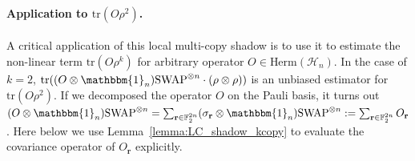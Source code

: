 \documentclass[aps,%
twocolumn,%
floatfix,%
pra,%
amsfonts,%
groupedaddress,%
superscriptaddress]{revtex4-2}%
\newcommand{\1}{\mathbbm{1}}
\begin{document}
\paragraph{Application to $\text{tr}(O \rho^2)$.}
A critical application of this local multi-copy shadow is to use it to estimate the non-linear term $\text{tr}(O \rho^k)$ for arbitrary operator $O \in \text{Herm}(\mathcal{H}_n)$.
In the case of $k  =2$, $\text{tr}((O \otimes \1_n) \text{SWAP}^{\otimes n}\cdot (\rho \otimes \rho))$ is an unbiased estimator for $\text{tr}(O \rho^2)$. If we decomposed the operator $O$ on the Pauli basis, it turns out $(O \otimes \1_n)\text{SWAP}^{\otimes n} = \sum_{\mathbf{r} \in \mathbb{F}_2^{2n}} (\sigma_{\mathbf{r}} \otimes  \1_n)\text{SWAP}^{\otimes n}:= \sum_{\mathbf{r} \in \mathbb{F}_2^{2n}} O_{\mathbf{r}} $.
Here below we use Lemma~\ref{lemma:LC_shadow_kcopy} to evaluate the covariance operator of $O_{\mathbf{r}}$ explicitly. 
\end{document}
